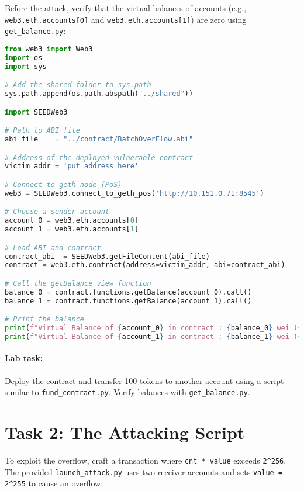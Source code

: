 Before the attack, verify that the virtual balances of accounts (e.g., \texttt{web3.eth.accounts[0]} and \texttt{web3.eth.accounts[1]}) are zero using \texttt{get\_balance.py}:

\begin{lstlisting}[language=python, caption={Checking balances (\texttt{get\_balance.py})}]
from web3 import Web3
import os
import sys

# Add the shared folder to sys.path
sys.path.append(os.path.abspath("../shared"))

import SEEDWeb3

# Path to ABI file
abi_file    = "../contract/BatchOverFlow.abi"

# Address of the deployed vulnerable contract
victim_addr = 'put address here'

# Connect to geth node (PoS)
web3 = SEEDWeb3.connect_to_geth_pos('http://10.151.0.71:8545')

# Choose a sender account
account_0 = web3.eth.accounts[0]
account_1 = web3.eth.accounts[1]

# Load ABI and contract
contract_abi  = SEEDWeb3.getFileContent(abi_file)
contract = web3.eth.contract(address=victim_addr, abi=contract_abi)

# Call the getBalance view function
balance_0 = contract.functions.getBalance(account_0).call()
balance_1 = contract.functions.getBalance(account_1).call()

# Print the balance
print(f"Virtual Balance of {account_0} in contract : {balance_0} wei ({web3.from_wei(balance_0, 'ether')} ETH)")
print(f"Virtual Balance of {account_1} in contract : {balance_1} wei ({web3.from_wei(balance_1, 'ether')} ETH)")
\end{lstlisting}

\paragraph{Lab task:} Deploy the contract and transfer 100 tokens to another account using a script similar to \texttt{fund\_contract.py}. Verify balances with \texttt{get\_balance.py}.

\section{Task 2: The Attacking Script}

To exploit the overflow, craft a transaction where \texttt{cnt * value} exceeds \texttt{2\^{}256}. The provided \texttt{launch\_attack.py} uses two receiver accounts and sets \texttt{value = 2\^{}255} to cause an overflow:

